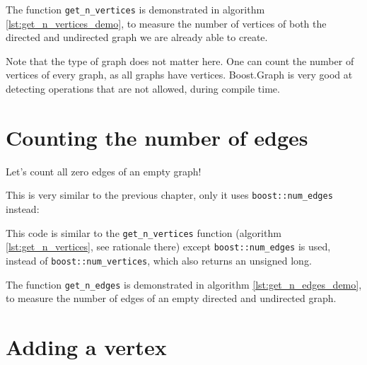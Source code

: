 The function \verb;get_n_vertices; is demonstrated in algorithm 
\ref{lst:get_n_vertices_demo}, 
to measure the number of vertices of both the directed and undirected
graph we are already able to create.



Note that the type of graph does not matter here.
One can count the number of vertices of every graph, as all graphs have
vertices.
Boost.Graph is very good at detecting operations that are not allowed, during
compile time.

\section{Counting the number of edges}
\label{subsec:get_n_edges}

Let's count all zero edges of an empty graph!

This is very similar to the previous chapter, 
only it uses \verb;boost::num_edges; 
instead:



This code is similar to the \verb;get_n_vertices; 
function (algorithm \ref{lst:get_n_vertices}, see rationale there) 
except \verb;boost::num_edges; 
is used, instead of \verb;boost::num_vertices;, 
which also returns an unsigned long.

The function \verb;get_n_edges; is demonstrated in algorithm 
\ref{lst:get_n_edges_demo}, 
to measure the number of edges of an empty directed and undirected graph.



\section{Adding a vertex}
\label{subsec:add_vertex}

